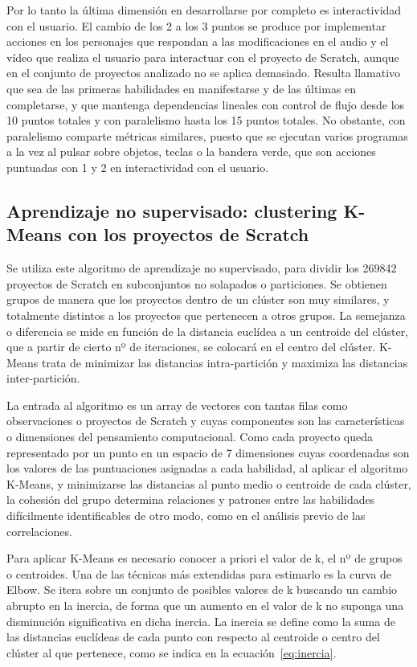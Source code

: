 \documentclass[a4paper, 12pt]{book}
\begin{document}
Por lo tanto la última dimensión en desarrollarse por completo es interactividad con el usuario. El cambio de los 2 a los 3 puntos se produce por implementar acciones en los personajes que respondan a las modificaciones en el audio y el vídeo que realiza el usuario para interactuar con el proyecto de Scratch, aunque en el conjunto de proyectos analizado no se aplica demasiado. Resulta llamativo que sea de las primeras habilidades en manifestarse y de las últimas en completarse, y que mantenga dependencias lineales con control de flujo desde los 10 puntos totales %
y con paralelismo hasta los 15 puntos totales. No obstante, con paralelismo comparte métricas similares, puesto que se ejecutan varios programas a la vez al pulsar sobre objetos, teclas o la bandera verde, que son acciones puntuadas con 1 y 2 en interactividad con el usuario. 

\subsection{Aprendizaje no supervisado: clustering K-Means con los proyectos de Scratch}
\label{subsec:kmeans_Scratch}

Se utiliza este algoritmo de aprendizaje no supervisado, para dividir los 269842 proyectos de Scratch en subconjuntos no solapados o particiones. Se obtienen grupos de manera que los proyectos dentro de un clúster son muy similares, y totalmente distintos a los proyectos que pertenecen a otros grupos. La semejanza o diferencia se mide en función de la distancia euclídea a un centroide del clúster, que a partir de cierto nº de iteraciones, se colocará en el centro del clúster. K-Means trata de minimizar las distancias intra-partición y maximiza las distancias inter-partición.

La entrada al algoritmo es un array de vectores con tantas filas como observaciones o proyectos de Scratch y cuyas componentes son las características o dimensiones del pensamiento computacional. Como cada proyecto queda representado por un punto en un espacio de 7 dimensiones cuyas coordenadas son los valores de las puntuaciones asignadas a cada habilidad, al aplicar el algoritmo K-Means, y minimizarse las distancias al punto medio o centroide de cada clúster, la cohesión del grupo determina relaciones y patrones entre las habilidades difícilmente identificables de otro modo, como en el análisis previo de las correlaciones. 

Para aplicar K-Means es necesario conocer a priori el valor de k, el nº de grupos o centroides. Una de las técnicas más extendidas para estimarlo es la curva de Elbow. Se itera sobre un conjunto de posibles valores de k buscando un cambio abrupto en la inercia, de forma que un aumento en el valor de k no suponga una disminución significativa en dicha inercia. La inercia se define como la suma de las distancias euclídeas de cada punto con respecto al centroide o centro del clúster al que pertenece, como se indica en la ecuación~\eqref{eq:inercia}.
\end{document}
